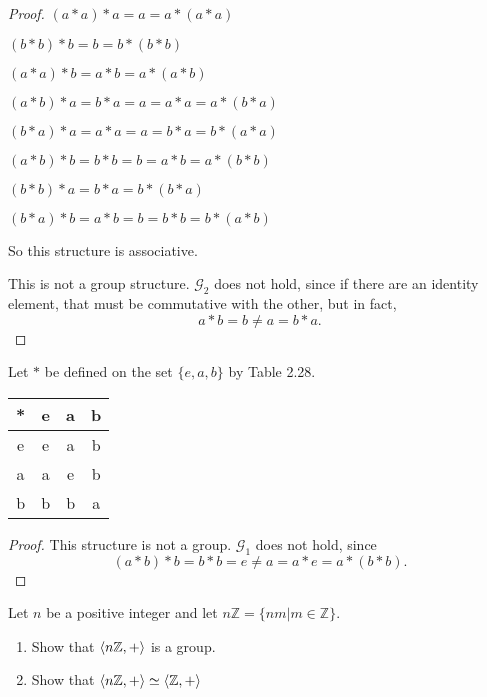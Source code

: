 \begin{proof}
    $(a * a) * a = a = a * (a * a)$

    $(b * b) * b = b = b * (b * b)$

    $(a * a) * b = a * b = a * (a * b)$

    $(a * b) * a = b * a = a = a * a = a * (b * a)$

    $(b * a) * a = a * a = a = b * a = b * (a * a)$

    $(a * b) * b = b * b = b = a * b = a * (b * b)$

    $(b * b) * a = b * a = b * (b * a)$

    $(b * a) * b = a * b = b = b * b = b * (a * b)$

    So this structure is associative.

    This is not a group structure. $\mathcal{G}_{2}$ does not hold, since if there are an identity element, that must be commutative with the other, but in fact,
    \[
        a * b = b \ne a = b * a.
    \]
\end{proof}

\begin{exercise}
    Let $*$ be defined on the set $\{ e, a, b \}$ by Table 2.28.
    \begin{tabular}{c|ccc}
        * & e & a & b \\
        \hline
        e & e & a & b \\
        a & a & e & b \\
        b & b & b & a
    \end{tabular}
\end{exercise}

\begin{proof}
    This structure is not a group. $\mathcal{G}_{1}$ does not hold, since
    \[
        (a * b) * b = b * b = e \ne a = a * e = a * (b * b).
    \]
\end{proof}

\begin{exercise}
    Let $n$ be a positive integer and let $n\mathbb{Z} = \{ nm \vert m\in\mathbb{Z} \}$.
    \begin{enumerate}[label={\textbf{\alph*.}}]
        \item Show that $\left\langle{n\mathbb{Z}, +}\right\rangle$ is a group.
        \item Show that $\left\langle{n\mathbb{Z}, +}\right\rangle \simeq \left\langle{\mathbb{Z}, +}\right\rangle$
    \end{enumerate}
\end{exercise}

